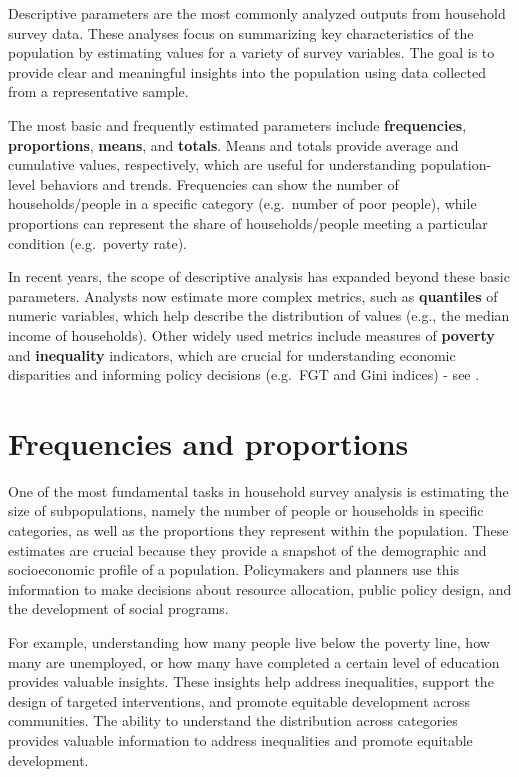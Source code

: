 \documentclass[
  12pt,
]{book}
\begin{document}
Descriptive parameters are the most commonly analyzed outputs from household survey data. These analyses focus on summarizing key characteristics of the population by estimating values for a variety of survey variables. The goal is to provide clear and meaningful insights into the population using data collected from a representative sample.

The most basic and frequently estimated parameters include \textbf{frequencies}, \textbf{proportions}, \textbf{means}, and \textbf{totals}. Means and totals provide average and cumulative values, respectively, which are useful for understanding population-level behaviors and trends. Frequencies can show the number of households/people in a specific category (e.g.~number of poor people), while proportions can represent the share of households/people meeting a particular condition (e.g.~poverty rate).

In recent years, the scope of descriptive analysis has expanded beyond these basic parameters. Analysts now estimate more complex metrics, such as \textbf{quantiles} of numeric variables, which help describe the distribution of values (e.g., the median income of households). Other widely used metrics include measures of \textbf{poverty} and \textbf{inequality} indicators, which are crucial for understanding economic disparities and informing policy decisions (e.g.~FGT and Gini indices) - see \citet{Jacob2024}.

\hypertarget{frequencies-and-proportions}{%
\section{Frequencies and proportions}\label{frequencies-and-proportions}}

One of the most fundamental tasks in household survey analysis is estimating the size of subpopulations, namely the number of people or households in specific categories, as well as the proportions they represent within the population. These estimates are crucial because they provide a snapshot of the demographic and socioeconomic profile of a population. Policymakers and planners use this information to make decisions about resource allocation, public policy design, and the development of social programs.

For example, understanding how many people live below the poverty line, how many are unemployed, or how many have completed a certain level of education provides valuable insights. These insights help address inequalities, support the design of targeted interventions, and promote equitable development across communities. The ability to understand the distribution across categories provides valuable information to address inequalities and promote equitable development.
\end{document}
